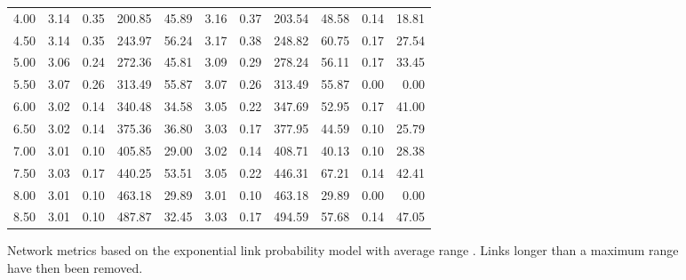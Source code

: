 \documentclass{article}
\begin{document}
\begin{figure}[h]
\begin{center}
\begin{tabular}{|r|rr|rr|rr|rr|rr|}
4.00 & 3.14 & 0.35 & 200.85 & 45.89 & 3.16 & 0.37 & 203.54 & 48.58 & 0.14 & 18.81\\
4.50 & 3.14 & 0.35 & 243.97 & 56.24 & 3.17 & 0.38 & 248.82 & 60.75 & 0.17 & 27.54\\
5.00 & 3.06 & 0.24 & 272.36 & 45.81 & 3.09 & 0.29 & 278.24 & 56.11 & 0.17 & 33.45\\
5.50 & 3.07 & 0.26 & 313.49 & 55.87 & 3.07 & 0.26 & 313.49 & 55.87 & 0.00 & 0.00\\
6.00 & 3.02 & 0.14 & 340.48 & 34.58 & 3.05 & 0.22 & 347.69 & 52.95 & 0.17 & 41.00\\
6.50 & 3.02 & 0.14 & 375.36 & 36.80 & 3.03 & 0.17 & 377.95 & 44.59 & 0.10 & 25.79\\
7.00 & 3.01 & 0.10 & 405.85 & 29.00 & 3.02 & 0.14 & 408.71 & 40.13 & 0.10 & 28.38\\
7.50 & 3.03 & 0.17 & 440.25 & 53.51 & 3.05 & 0.22 & 446.31 & 67.21 & 0.14 & 42.41\\
8.00 & 3.01 & 0.10 & 463.18 & 29.89 & 3.01 & 0.10 & 463.18 & 29.89 & 0.00 & 0.00\\
8.50 & 3.01 & 0.10 & 487.87 & 32.45 & 3.03 & 0.17 & 494.59 & 57.68 & 0.14 & 47.05\\
\hline
\end{tabular}
\caption{Network metrics based on the exponential link probability model with average range . Links longer than a maximum range  have then been removed.}
\label{exp_exp_r}
\end{center}
\end{figure}
\end{document}
